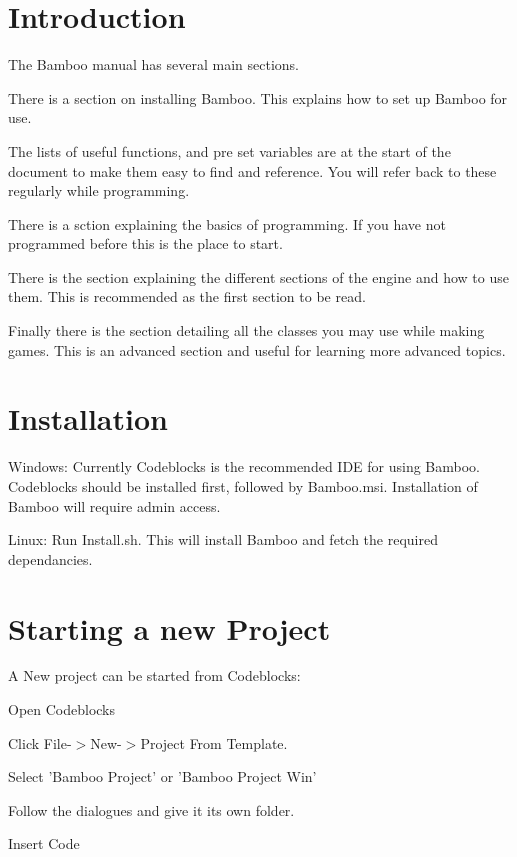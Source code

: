 \hypertarget{index_MainPageIntro}{}\section{Introduction}\label{index_MainPageIntro}
The Bamboo manual has several main sections.
\begin{DoxyItemize}
\item There is a section on installing Bamboo. This explains how to set up Bamboo for use.
\item The lists of useful functions, and pre set variables are at the start of the document to make them easy to find and reference. You will refer back to these regularly while programming.
\item There is a sction explaining the basics of programming. If you have not programmed before this is the place to start.
\item There is the section explaining the different sections of the engine and how to use them. This is recommended as the first section to be read.
\item Finally there is the section detailing all the classes you may use while making games. This is an advanced section and useful for learning more advanced topics.
\end{DoxyItemize}\hypertarget{index_InstallationMainPage}{}\section{Installation}\label{index_InstallationMainPage}
Windows: Currently Codeblocks is the recommended IDE for using Bamboo. Codeblocks should be installed first, followed by Bamboo.msi. Installation of Bamboo will require admin access.

Linux: Run Install.sh. This will install Bamboo and fetch the required dependancies.\hypertarget{index_NewProjectMainPage}{}\section{Starting a new Project}\label{index_NewProjectMainPage}
A New project can be started from Codeblocks:
\begin{DoxyItemize}
\item Open Codeblocks
\item Click File-\/$>$New-\/$>$Project From Template.
\item Select 'Bamboo Project' or 'Bamboo Project Win'
\item Follow the dialogues and give it its own folder.
\item Insert Code
\end{DoxyItemize}